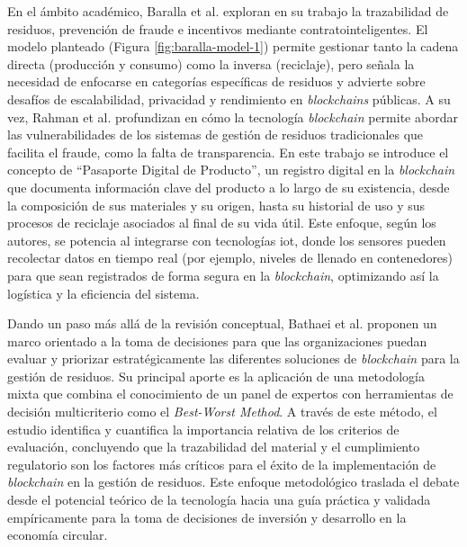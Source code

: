 En el ámbito académico, Baralla et al. \cite{baralla2023waste} exploran en su trabajo la trazabilidad de residuos, prevención de fraude e incentivos mediante \glspl{contratointeligente}. El modelo planteado (Figura \ref{fig:baralla-model-1}) permite gestionar tanto la cadena directa (producción y consumo) como la inversa (reciclaje), pero señala la necesidad de enfocarse en categorías específicas de residuos y advierte sobre desafíos de escalabilidad, privacidad y rendimiento en \textit{blockchains} públicas. A su vez, Rahman et al. \cite{rahman2025traceable} profundizan en cómo la tecnología \textit{blockchain} permite abordar las vulnerabilidades de los sistemas de gestión de residuos tradicionales que facilita el fraude, como la falta de transparencia. En este trabajo se introduce el concepto de ``Pasaporte Digital de Producto'', un registro digital en la \textit{blockchain} que documenta información clave del producto a lo largo de su existencia, desde la composición de sus materiales y su origen, hasta su historial de uso y sus procesos de reciclaje asociados al final de su vida útil. Este enfoque, según los autores, se potencia al integrarse con tecnologías \gls{iot}, donde los sensores pueden recolectar datos en tiempo real (por ejemplo, niveles de llenado en contenedores) para que sean registrados de forma segura en la \textit{blockchain}, optimizando así la logística y la eficiencia del sistema.

Dando un paso más allá de la revisión conceptual, Bathaei et al. \cite{bathaei2025blockchain} proponen un marco orientado a la toma de decisiones para que las organizaciones puedan evaluar y priorizar estratégicamente las diferentes soluciones de \textit{blockchain} para la gestión de residuos. Su principal aporte es la aplicación de una metodología mixta que combina el conocimiento de un panel de expertos con herramientas de decisión multicriterio como el \textit{Best-Worst Method}. A través de este método, el estudio identifica y cuantifica la importancia relativa de los criterios de evaluación, concluyendo que la trazabilidad del material y el cumplimiento regulatorio son los factores más críticos para el éxito de la implementación de \textit{blockchain} en la gestión de residuos. Este enfoque metodológico traslada el debate desde el potencial teórico de la tecnología hacia una guía práctica y validada empíricamente para la toma de decisiones de inversión y desarrollo en la economía circular.

